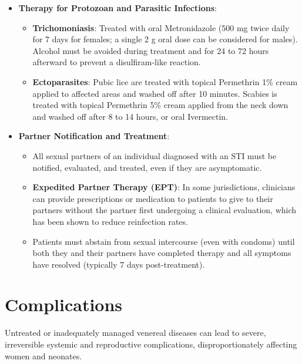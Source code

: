\begin{itemize}
\begin{itemize}
        \item \textbf{Hepatitis B Virus (HBV)}: Acute HBV is managed supportively. Chronic HBV may require long-term therapy with oral nucleoside/nucleotide analogues (such as Tenofovir or Entecavir) to suppress viral replication, slow the progression of liver fibrosis, and lower the risk of hepatocellular carcinoma.
    \end{itemize}
    \item \textbf{Therapy for Protozoan and Parasitic Infections}:
    \begin{itemize}
        \item \textbf{Trichomoniasis}: Treated with oral Metronidazole (500 mg twice daily for 7 days for females; a single 2 g oral dose can be considered for males). Alcohol must be avoided during treatment and for 24 to 72 hours afterward to prevent a disulfiram-like reaction.
        \item \textbf{Ectoparasites}: Pubic lice are treated with topical Permethrin 1\% cream applied to affected areas and washed off after 10 minutes. Scabies is treated with topical Permethrin 5\% cream applied from the neck down and washed off after 8 to 14 hours, or oral Ivermectin.
    \end{itemize}
    \item \textbf{Partner Notification and Treatment}:
    \begin{itemize}
        \item All sexual partners of an individual diagnosed with an STI must be notified, evaluated, and treated, even if they are asymptomatic.
        \item \textbf{Expedited Partner Therapy (EPT)}: In some jurisdictions, clinicians can provide prescriptions or medication to patients to give to their partners without the partner first undergoing a clinical evaluation, which has been shown to reduce reinfection rates.
        \item Patients must abstain from sexual intercourse (even with condoms) until both they and their partners have completed therapy and all symptoms have resolved (typically 7 days post-treatment).
    \end{itemize}
\end{itemize}

\section*{Complications}
Untreated or inadequately managed venereal diseases can lead to severe, irreversible systemic and reproductive complications, disproportionately affecting women and neonates.

